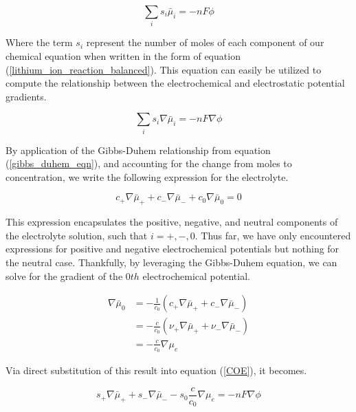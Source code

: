 \documentclass[lettersize,journal]{IEEEtran}
\begin{document}
\begin{equation}
\sum_{i} s_{i} \bar{\mu}_{i}=-n F \phi
\end{equation}

Where the term $s_i$ represent the number of moles of each component of our chemical equation when written in the form of equation (\ref{lithium_ion_reaction_balanced}). This equation can easily be utilized to compute the relationship between the electrochemical and electrostatic potential gradients.

\begin{equation}\label{COE}
\sum_{i} s_{i} \nabla \bar{\mu}_{i}=-n F \nabla \phi
\end{equation}

By application of the Gibbs-Duhem relationship from equation (\ref{gibbs_duhem_eqn}), and accounting for the change from moles to concentration, we write the following expression for the electrolyte.

\begin{equation}
c_{+} \nabla \bar{\mu}_{+}+c_{-} \nabla \bar{\mu}_{-}+c_{0} \nabla \bar{\mu}_{0}=0
\end{equation}

This expression encapsulates the positive, negative, and neutral components of the electrolyte solution, such that $i = +, -, 0$. Thus far, we have only encountered expressions for positive and negative electrochemical potentials but nothing for the neutral case. Thankfully, by leveraging the Gibbs-Duhem equation, we can solve for the gradient of the $0th$ electrochemical potential.

\begin{equation}
\begin{aligned}
\nabla \bar{\mu}_{0} &=-\frac{1}{c_{0}}\left(c_{+} \nabla \bar{\mu}_{+}+c_{-} \nabla \bar{\mu}_{-}\right) \\
&=-\frac{c}{c_{0}}\left(\nu_{+} \nabla \bar{\mu}_{+}+\nu_{-} \nabla \bar{\mu}_{-}\right) \\
&=-\frac{c}{c_{0}} \nabla \mu_{e}
\end{aligned}
\end{equation}

\noindent Via direct substitution of this result into equation (\ref{COE}), it becomes.

\begin{equation}
s_{+} \nabla \bar{\mu}_{+}+s_{-} \nabla \bar{\mu}_{-}-s_{0} \frac{c}{c_{0}} \nabla \mu_{e}=-n F \nabla \phi
\end{equation}
\end{document}
